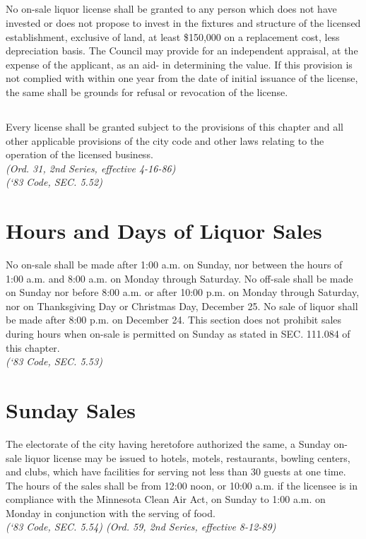 \subsection{}
No on-sale liquor license shall be granted to any person which does not have invested or does not propose to invest in the fixtures and structure of the licensed establishment, exclusive of land, at least \$150,000 on a replacement cost, less depreciation basis.  The Council may provide for an independent appraisal, at the expense of the applicant, as an aid- in determining the value.  If this provision is not complied with within one year from the date of initial issuance of the license, the same shall be grounds for refusal or revocation of the license.
\subsection{}
Every license shall be granted subject to the provisions of this chapter and all other applicable provisions of the city code and other laws relating to the operation of the licensed business.\\
\emph{(Ord. 31, 2nd Series, effective 4-16-86)}\\
\emph{(‘83 Code, SEC. 5.52)}
\section{Hours and Days of Liquor Sales}
No on-sale shall be made after 1:00 a.m. on Sunday, nor between the hours of 1:00 a.m. and 8:00 a.m. on Monday through Saturday.  No off-sale shall be made on Sunday nor before 8:00 a.m. or after 10:00 p.m. on Monday through Saturday, nor on Thanksgiving Day or Christmas Day, December 25.  No sale of liquor shall be made after 8:00 p.m. on December 24.  This section does not prohibit sales during hours when on-sale is permitted on Sunday as stated in SEC. 111.084 of this chapter.\\
\emph{(‘83 Code, SEC. 5.53)}
\section{Sunday Sales}
The electorate of the city having heretofore authorized the same, a Sunday on-sale liquor license may be issued to hotels, motels, restaurants, bowling centers, and clubs, which have facilities for serving not less than 30 guests at one time.  The hours of the sales shall be from 12:00 noon, or 10:00 a.m. if the licensee is in compliance with the Minnesota Clean Air Act, on Sunday to 1:00 a.m. on Monday in conjunction with the serving of food.\\
\emph{(‘83 Code, SEC. 5.54)  (Ord. 59, 2nd Series, effective 8-12-89)}
